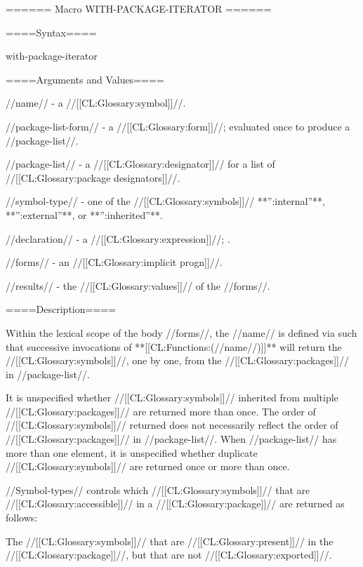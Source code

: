 ====== Macro WITH-PACKAGE-ITERATOR ======

====Syntax====

\DefmacWithValuesNewline with-package-iterator {  } {}

====Arguments and Values====

//name// - a //[[CL:Glossary:symbol]]//.

//package-list-form// - a //[[CL:Glossary:form]]//; evaluated once to produce a //package-list//.

//package-list// - a //[[CL:Glossary:designator]]// for a list of //[[CL:Glossary:package designators]]//.

//symbol-type// - one of the //[[CL:Glossary:symbols]]// **'':internal''**, **'':external''**, or **'':inherited''**.

//declaration// - a  //[[CL:Glossary:expression]]//; \noeval.

//forms// - an //[[CL:Glossary:implicit progn]]//.

//results// - the //[[CL:Glossary:values]]// of the //forms//.

====Description====

Within the lexical scope of the body //forms//, the //name// is defined via  such that successive invocations of **[[CL:Functions:(//name//)]]** will return the //[[CL:Glossary:symbols]]//, one by one, from the //[[CL:Glossary:packages]]// in //package-list//.

It is unspecified whether //[[CL:Glossary:symbols]]// inherited from multiple //[[CL:Glossary:packages]]// are returned more than once. The order of //[[CL:Glossary:symbols]]// returned does not necessarily reflect the order of //[[CL:Glossary:packages]]// in //package-list//. When //package-list// has more than one element, it is unspecified whether duplicate //[[CL:Glossary:symbols]]// are returned once or more than once.

//Symbol-types// controls which //[[CL:Glossary:symbols]]// that are //[[CL:Glossary:accessible]]// in a //[[CL:Glossary:package]]// are returned as follows:

\beginlist {}

The //[[CL:Glossary:symbols]]// that are //[[CL:Glossary:present]]// in the //[[CL:Glossary:package]]//, but that are not //[[CL:Glossary:exported]]//.


